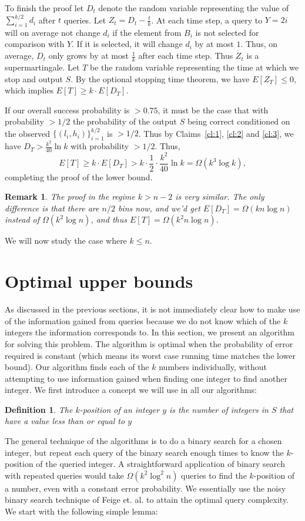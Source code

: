 \documentclass[12pt]{article}
\newtheorem{remark}[theorem]{Remark}
\newtheorem{mydef}[theorem]{Definition}
\newcommand{\Om}{\Omega}
\begin{document}
To finish the proof let $D_t$ denote the random variable representing the value of $\sum_{i=1}^{k/2} d_i$ after $t$ queries. Let $Z_t=D_t-\frac{t}{k}$. 
At each time step, a query to $Y=2i$ will on average not change $d_i$ if the element from $B_i$ is not selected for comparison with $Y$. If it is selected, 
it will change $d_i$ by at most $1$. Thus, on average, $D_t$ only grows by at most $\frac{1}{k}$ after each time step. Thus $Z_t$ is a supermartingale. 
Let $T$ be the random variable representing the time at which we stop and output $S$.  By the optional stopping time theorem, we have $E[Z_T]\le 0$, which implies
$E[T]\ge k\cdot E[D_T]$.

If our overall success probability is $>0.75$, it must be the case that with probability $>1/2$ the probability of the output $S$ being correct conditioned 
on the observed $\{(l_i,h_i)\}_{i=1}^{k/2}$ is $>1/2$. Thus by Claims~\ref{cl:1}, \ref{cl:2} and \ref{cl:3}, we have $D_T>\frac{k^2}{40} \ln k$ with probability 
$>1/2$. Thus, 
$$
E[T] \ge k\cdot E[D_T] > k \cdot \frac{1}{2} \cdot \frac{k^2}{40} \ln k = \Om(k^3 \log k), 
$$
completing the proof of the lower bound. 

\begin{remark}
The proof in the regime $k>n - 2$ is very similar. The only difference is that there are $n/2$ bins now, and we'd get $E[D_T]=\Om (k n\log n)$ instead 
of $\Om(k^2 \log n)$, and thus $E[T]=\Om(k^2 n \log n)$. 
\end{remark}

We will now study the case where $k \leq n$.



\section{Optimal upper bounds} \label{sec:algorithm}

As discussed in the previous sections, it is not immediately clear how to make use of the information gained from queries because we do not know which of the $k$ integers the information corresponds to. In this section, we present an algorithm for solving this problem. The algorithm is optimal when the probability of error required is constant (which means its worst case running time matches the lower bound). Our algorithm finds each of the $k$ numbers individually, without attempting to use information gained when finding one integer to find another integer. We first introduce a concept we will use in all our algorithms: 
\begin{mydef}
The $k$-position of an integer $y$ is the number of integers in $S$ that have a value less than or equal to $y$
\end{mydef}
The general technique of the algorithms is to do a binary search for a chosen integer, but repeat each query of the binary search enough times to know the $k$-position of the queried integer. 
A straightforward application of binary search with repeated queries would take $\Om(k^2 \log^2 n)$ queries to find the $k$-position of a number, even with a constant error probability. 
We essentially use the noisy binary search technique of Feige et. al. \cite{Feige} to attain the optimal query complexity.  We start with the following simple lemma:
\end{document}
